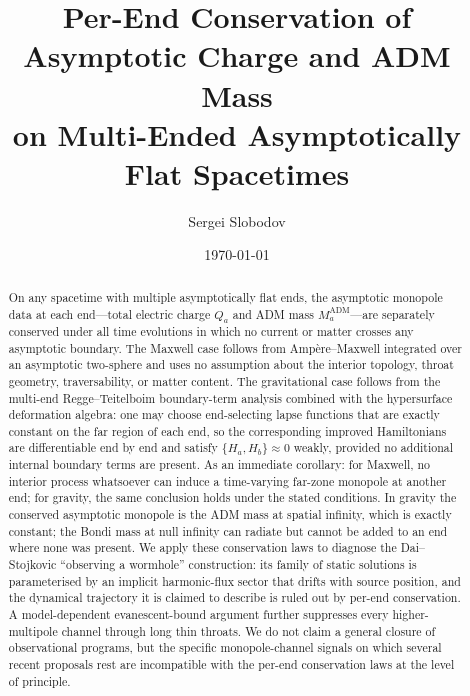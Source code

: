 \documentclass[aps,prd,onecolumn,nofootinbib,superscriptaddress]{revtex4-2}
\begin{document}
\title{Per-End Conservation of Asymptotic Charge and ADM Mass\\
on Multi-Ended Asymptotically Flat Spacetimes}

\author{Sergei Slobodov}

\date{\today}

\begin{abstract}
On any spacetime with multiple asymptotically flat ends, the asymptotic monopole data at each end---total electric charge $Q_a$ and ADM mass $M_a^{\mathrm{ADM}}$---are separately conserved under all time evolutions in which no current or matter crosses any asymptotic boundary. The Maxwell case follows from Amp\`ere--Maxwell integrated over an asymptotic two-sphere and uses no assumption about the interior topology, throat geometry, traversability, or matter content. The gravitational case follows from the multi-end Regge--Teitelboim boundary-term analysis combined with the hypersurface deformation algebra: one may choose end-selecting lapse functions that are exactly constant on the far region of each end, so the corresponding improved Hamiltonians are differentiable end by end and satisfy $\{H_a,H_b\}\approx 0$ weakly, provided no additional internal boundary terms are present. As an immediate corollary: for Maxwell, no interior process whatsoever can induce a time-varying far-zone monopole at another end; for gravity, the same conclusion holds under the stated conditions. In gravity the conserved asymptotic monopole is the ADM mass at spatial infinity, which is exactly constant; the Bondi mass at null infinity can radiate but cannot be added to an end where none was present. We apply these conservation laws to diagnose the Dai--Stojkovic ``observing a wormhole'' construction: its family of static solutions is parameterised by an implicit harmonic-flux sector that drifts with source position, and the dynamical trajectory it is claimed to describe is ruled out by per-end conservation. A model-dependent evanescent-bound argument further suppresses every higher-multipole channel through long thin throats. We do not claim a general closure of observational programs, but the specific monopole-channel signals on which several recent proposals rest are incompatible with the per-end conservation laws at the level of principle.
\end{abstract}

\maketitle
\end{document}
